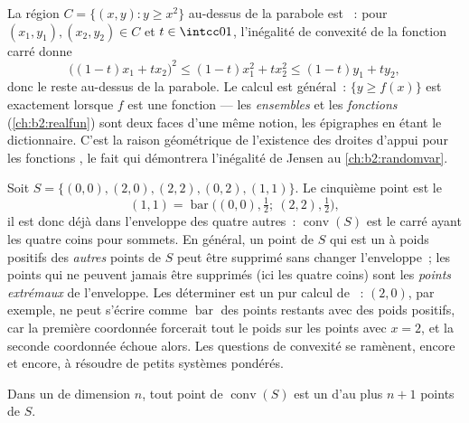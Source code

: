 \begin{example}\label{ex:b2:affine:epigraph}
La région $C = \{(x, y) : y \geq x^2\}$ au-dessus de la parabole
est ~: pour $(x_1, y_1), (x_2, y_2) \in C$ et $t \in
\intcc01$, l'inégalité de convexité de la fonction carré
donne
\[
\bigl((1-t)x_1 + tx_2\bigr)^2 \leq (1-t)x_1^2 + tx_2^2
\leq (1-t)y_1 + ty_2 ,
\]
donc le  reste au-dessus de la parabole. Le calcul
est général~: $\{y \geq f(x)\}$ est  exactement lorsque $f$ est
une fonction  --- les \emph{ensembles}  et les
\emph{fonctions}  (\cref{ch:b2:realfun}) sont deux faces d'une
même notion, les épigraphes en étant le dictionnaire. C'est la raison
géométrique de l'existence des droites d'appui pour les fonctions
, le fait qui démontrera l'inégalité de Jensen au
\cref{ch:b2:randomvar}.
\end{example}

\begin{example}\label{ex:b2:affine:squarehull}
Soit $S = \{(0,0), (2,0), (2,2), (0,2), (1,1)\}$. Le cinquième
point est le 
\[
(1,1) = \operatorname{bar}\bigl((0,0), \tfrac12;\ (2,2),
\tfrac12\bigr),
\]
il est donc déjà dans l'enveloppe des quatre autres~:
$\operatorname{conv}(S)$ est le carré ayant les quatre coins
pour sommets. En général, un point de $S$ qui est un
 à poids positifs des \emph{autres} points de
$S$ peut être supprimé sans changer l'enveloppe~; les points qui
ne peuvent jamais être supprimés (ici les quatre coins) sont les
\emph{points extrémaux} de l'enveloppe. Les déterminer est un pur
calcul de ~: $(2,0)$, par exemple, ne peut s'écrire comme
$\operatorname{bar}$ des points restants avec des poids positifs, car
la première coordonnée forcerait tout le poids sur les points avec $x =
2$, et la seconde coordonnée échoue alors. Les questions de convexité
se ramènent, encore et encore, à résoudre de petits systèmes pondérés.
\end{example}

\begin{theorem}[Carathéodory]\label{thm:b2:affine:caratheodory}
Dans un  de dimension $n$, tout point de
$\operatorname{conv}(S)$ est un  d'au plus $n + 1$ points
de $S$.
\end{theorem}

